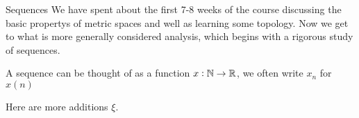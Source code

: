 \begin{chapter}{Sequences}
    We have spent about the first 7-8 weeks of the course discussing the basic propertys of metric spaces and well as learning some topology. Now we get to what is more generally considered analysis, 
    which begins with a rigorous study of sequences. 


	A sequence can be thought of as a function $x: \mathbb{N} \to \mathbb{R}$, we often write $x_n $ for $x(n)$ 


	Here are more additions $\xi$. 

\end{chapter}
